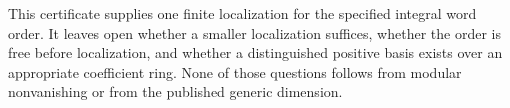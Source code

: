 

This certificate supplies one finite localization for the specified integral word order. It leaves open whether a smaller localization suffices, whether the order is free before localization, and whether a distinguished positive basis exists over an appropriate coefficient ring. None of those questions follows from modular nonvanishing or from the published generic dimension.
\clearpage
